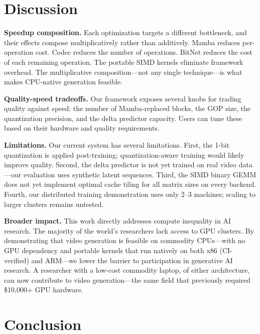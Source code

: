 \documentclass[11pt]{article}
\begin{document}
\section{Discussion}

\textbf{Speedup composition.} Each optimization targets a different bottleneck, and their effects compose multiplicatively rather than additively. Mamba reduces per-operation cost. Codec reduces the number of operations. BitNet reduces the cost of each remaining operation. The portable SIMD kernels eliminate framework overhead. The multiplicative composition---not any single technique---is what makes CPU-native generation feasible.

\textbf{Quality-speed tradeoffs.} Our framework exposes several knobs for trading quality against speed: the number of Mamba-replaced blocks, the GOP size, the quantization precision, and the delta predictor capacity. Users can tune these based on their hardware and quality requirements.

\textbf{Limitations.} Our current system has several limitations. First, the 1-bit quantization is applied post-training; quantization-aware training would likely improve quality. Second, the delta predictor is not yet trained on real video data---our evaluation uses synthetic latent sequences. Third, the SIMD binary GEMM does not yet implement optimal cache tiling for all matrix sizes on every backend. Fourth, our distributed training demonstration uses only 2--3 machines; scaling to larger clusters remains untested.

\textbf{Broader impact.} This work directly addresses compute inequality in AI research. The majority of the world's researchers lack access to GPU clusters. By demonstrating that video generation is feasible on commodity CPUs---with no GPU dependency and portable kernels that run natively on both x86 (CI-verified) and ARM---we lower the barrier to participation in generative AI research. A researcher with a low-cost commodity laptop, of either architecture, can now contribute to video generation---the same field that previously required \$10,000+ GPU hardware.


\section{Conclusion}
\end{document}
